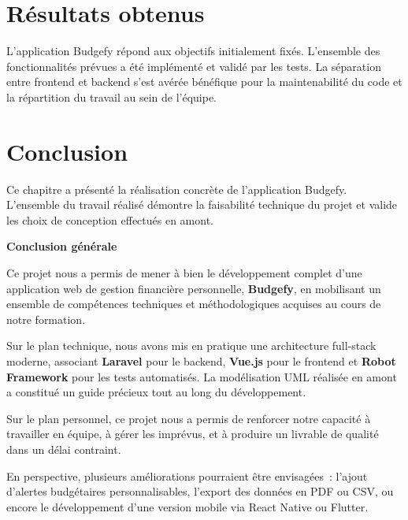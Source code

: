 \documentclass{rapportPFA}
\begin{document}
\section{R\'esultats obtenus}

L'application Budgefy r\'epond aux objectifs initialement fix\'es. L'ensemble des
fonctionnalit\'es pr\'evues a \'et\'e impl\'ement\'e et valid\'e par les tests.
La s\'eparation entre frontend et backend s'est av\'er\'ee b\'en\'efique pour la
maintenabilit\'e du code et la r\'epartition du travail au sein de l'\'equipe.

\section{Conclusion}

Ce chapitre a pr\'esent\'e la r\'ealisation concr\`ete de l'application Budgefy.
L'ensemble du travail r\'ealis\'e d\'emontre la faisabilit\'e technique du projet
et valide les choix de conception effectu\'es en amont.

\newpage
{}
{}
\vspace*{3cm}
\begin{center}
    {\LARGE \textbf{Conclusion g\'en\'erale}}
\end{center}
\vspace{2cm}

Ce projet nous a permis de mener \`a bien le d\'eveloppement complet d'une application
web de gestion financi\`ere personnelle, \textbf{Budgefy}, en mobilisant un ensemble de
comp\'etences techniques et m\'ethodologiques acquises au cours de notre formation.

Sur le plan technique, nous avons mis en pratique une architecture full-stack moderne,
associant \textbf{Laravel} pour le backend, \textbf{Vue.js} pour le frontend et
\textbf{Robot Framework} pour les tests automatis\'es. La mod\'elisation UML r\'ealis\'ee
en amont a constitu\'e un guide pr\'ecieux tout au long du d\'eveloppement.

Sur le plan personnel, ce projet nous a permis de renforcer notre capacit\'e \`a
travailler en \'equipe, \`a g\'erer les impr\'evus, et \`a produire un livrable de
qualit\'e dans un d\'elai contraint.

En perspective, plusieurs am\'eliorations pourraient \^etre envisag\'ees~: l'ajout
d'alertes budg\'etaires personnalisables, l'export des donn\'ees en PDF ou CSV, ou
encore le d\'eveloppement d'une version mobile via React Native ou Flutter.
\end{document}
